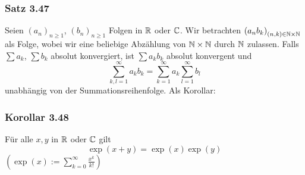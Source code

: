 \subsubsection*{Satz 3.47}
Seien $\left( a_n\right)_{n\geq 1}$, $\left( b_n\right)_{n\geq 1}$ Folgen in $\mathbb{R}$ oder $\mathbb{C}$. Wir betrachten $\left( a_n b_k\right)_{(n,k)\in\mathbb{N}\times\mathbb{N}}$ als Folge, wobei wir eine beliebige Abzählung von $\mathbb{N}\times\mathbb{N}$ durch $\mathbb{N}$ zulassen. Falls $\sum a_k$, $\sum b_k$ absolut konvergiert, ist $\sum a_k b_k$ absolut konvergent und
\[\sum\limits_{k,l = 1}^\infty  {{a_k}{b_k}}  = \sum\limits_{k = 1}^\infty  {{a_k}} \sum\limits_{l = 1}^\infty  {{b_l}} \]
unabhängig von der Summationsreihenfolge. Als Korollar:

\subsubsection*{Korollar 3.48}
Für alle $x,y$ in $\mathbb{R}$ oder $\mathbb{C}$ gilt
\[ \exp\left( x+y\right)=\exp(x)\exp(y)\]
$\left( \exp(x):=\sum\limits_{k=0}^\infty \frac{x^k}{k!}\right)$

